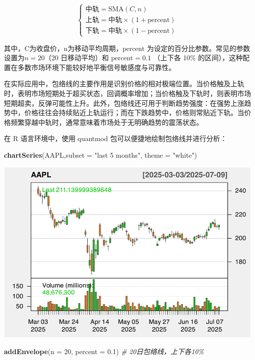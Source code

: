 \documentclass[]{ctexbook}
\newenvironment{Shaded}{\begin{snugshade}}{\end{snugshade}}
\newcommand{\AttributeTok}[1]{\textcolor[rgb]{0.13,0.29,0.53}{#1}}
\newcommand{\CommentTok}[1]{\textcolor[rgb]{0.56,0.35,0.01}{\textit{#1}}}
\newcommand{\DecValTok}[1]{\textcolor[rgb]{0.00,0.00,0.81}{#1}}
\newcommand{\FloatTok}[1]{\textcolor[rgb]{0.00,0.00,0.81}{#1}}
\newcommand{\FunctionTok}[1]{\textcolor[rgb]{0.13,0.29,0.53}{\textbf{#1}}}
\newcommand{\NormalTok}[1]{#1}
\newcommand{\StringTok}[1]{\textcolor[rgb]{0.31,0.60,0.02}{#1}}
\begin{document}
\[
\begin{cases}
\text{中轨} = \text{SMA}(C, n) \\
\text{上轨} = \text{中轨} \times (1 + \text{percent}) \\
\text{下轨} = \text{中轨} \times (1 - \text{percent})
\end{cases}
\]

其中，C为收盘价，n为移动平均周期，\(\text{percent}\) 为设定的百分比参数。常见的参数设置为\(n=20\)（20 日移动平均）和 \(\text{percent}=0.1\) （上下各 10\% 的区间），这种配置在多数市场环境下能较好地平衡信号敏感度与可靠性。

在实际应用中，包络线的主要作用是识别价格的相对极端位置。当价格触及上轨时，表明市场短期处于超买状态，回调概率增加；当价格触及下轨时，则表明市场短期超卖，反弹可能性上升。此外，包络线还可用于判断趋势强度：在强势上涨趋势中，价格往往会持续贴近上轨运行；而在下跌趋势中，价格则常贴近下轨。当价格频繁穿越中轨时，通常意味着市场处于无明确趋势的震荡状态。

在 R 语言环境中，使用 quantmod 包可以便捷地绘制包络线并进行分析：

\begin{Shaded}
\begin{Highlighting}[]
\FunctionTok{chartSeries}\NormalTok{(AAPL,}\AttributeTok{subset =} \StringTok{"last 5 months"}\NormalTok{, }\AttributeTok{theme =} \StringTok{"white"}\NormalTok{)}
\end{Highlighting}
\end{Shaded}

\includegraphics[width=0.9\linewidth]{quantmod_files/figure-latex/envol-1}

\begin{Shaded}
\begin{Highlighting}[]
\FunctionTok{addEnvelope}\NormalTok{(}\AttributeTok{n =} \DecValTok{20}\NormalTok{, }\AttributeTok{percent =} \FloatTok{0.1}\NormalTok{)  }\CommentTok{\# 20日包络线，上下各10\%}
\end{Highlighting}
\end{Shaded}
\end{document}
